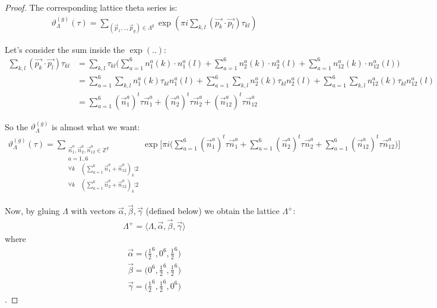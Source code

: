 \documentclass{article}
\newcommand{\ZZ}{\mathbb{Z}}
\theoremstyle{plain}
\theoremstyle{definition}
\begin{document}
\begin{proof}
        The corresponding lattice theta series is:
        \begin{align}
            \vartheta^{(g)}_{\Lambda}(\tau) = \sum_{(\vec p_1, .., \vec p_g) \in \Lambda^g} 
                \exp(\pi i \sum_{k,l} ({\vec{p_k}} \cdot {\vec{p_l}}) \tau_{kl})
        \end{align}
        
        Let's consider the sum inside the $\exp(..)$:
        \begin{align}
            \sum_{k,l} ({\vec{p_k}} \cdot {\vec{p_l}}) \tau_{kl} 
            &= \sum_{k, l} \tau_{kl} \Big ( 
                \sum_{a=1}^6 n_1^a(k) \cdot n_1^a(l) +
                \sum_{a=1}^6 n_2^a(k) \cdot n_2^a(l) +
                \sum_{a=1}^6 n_{12}^a(k) \cdot n_{12}^a(l)
            \Big) \nonumber \\
            &= \sum_{a=1}^6 \sum_{k,l} n_1^a(k) \tau_{kl} n_1^a(l) + 
            \sum_{a=1}^6 \sum_{k,l} n_2^a(k) \tau_{kl} n_2^a(l) + 
            \sum_{a=1}^6 \sum_{k,l} n_{12}^a(k) \tau_{kl} n_{12}^a(l) \nonumber \\
            &= \sum_{a=1}^6 (\vec n_1^a)^t \tau \vec n_1^a + (\vec n_2^a)^t \tau \vec n_2^a + (\vec n_{12}^a)^t \tau \vec n_{12}^a
        \end{align}

        So the $\vartheta^{(g)}_\Lambda$ is almost what we want:
        \begin{align}
            \vartheta^{(g)}_\Lambda(\tau) = 
            \sum_{\substack{
                \vec{n}_1^a, \vec{n}_2^a, \vec{n}_{12}^a \in \ZZ^g \\
                a = 1..6 \\
                \forall k \quad (\sum_{a=1}^6 \vec{n}_1^a + \vec{n}_{12}^a)_k \vdots 2 \\ 
                \forall k \quad (\sum_{a=1}^6 \vec{n}_2^a + \vec{n}_{12}^a)_k \vdots 2
            }} \exp \Big [ \pi i \Big(
                \sum_{a=1}^6 (\vec{n}_1^a)^t \tau \vec{n}_1^a + 
                \sum_{a=1}^6 (\vec{n}_2^a)^t \tau \vec{n}_2^a + 
                \sum_{a=1}^6 (\vec{n}_{12}^a)^t \tau \vec{n}_{12}^a
            \Big) \Big]
        \end{align}

        Now, by gluing $\Lambda$ with vectors $\vec{\alpha}, \vec{\beta}, \vec{\gamma}$ (defined below) we obtain
        the lattice $\Lambda^+$:
        \begin{align}
            \Lambda^+ = 
            \langle \Lambda , \vec \alpha, \vec \beta, \vec \gamma \rangle
        \end{align}
        where 
        \begin{align}
            \vec{\alpha}=\big(\frac{1}{2}^6, 0^6, \frac{1}{2}^6 \big) \\
            \vec{\beta}=\big(0^6, \frac{1}{2}^6, \frac{1}{2}^6\big) \\
            \vec{\gamma}=\big(\frac{1}{2}^6, \frac{1}{2}^6, 0^6\big)
        \end{align}.


\end{proof}
\end{document}

